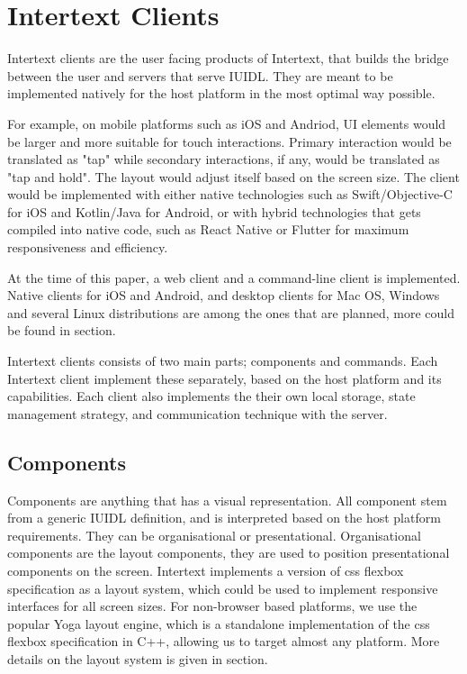 
\section{Intertext Clients} \label{intertextClients}

Intertext clients are the user facing products of Intertext, that builds the bridge between the user and servers that serve IUIDL. They are meant to be implemented natively for the host platform in the most optimal way possible. 

For example, on mobile platforms such as iOS and Andriod, UI elements would be larger and more suitable for touch interactions. Primary interaction would be translated as "tap" while secondary interactions, if any, would be translated as "tap and hold". The layout would adjust itself based on the screen size. The client would be implemented with either native technologies such as Swift/Objective-C for iOS and Kotlin/Java for Android, or with hybrid technologies that gets compiled into native code, such as React Native or Flutter for maximum responsiveness and efficiency. 

At the time of this paper, a web client and a command-line client is implemented. Native clients for iOS and Android, and desktop clients for Mac OS, Windows and several Linux distributions are among the ones that are planned, more could be found in  section.

Intertext clients consists of two main parts; components and commands. Each Intertext client implement these separately, based on the host platform and its capabilities. Each client also implements the  their own local storage, state management strategy, and communication technique with the server.

\subsection{Components}

Components are anything that has a visual representation. All component stem from a generic IUIDL definition, and is interpreted based on the host platform requirements. They can be organisational or presentational. Organisational components are the layout components, they are used to position presentational components on the screen. Intertext implements a version of css flexbox specification as a layout system, which could be used to implement responsive interfaces for all screen sizes. For non-browser based platforms, we use the popular Yoga layout engine, which is a standalone implementation of the css flexbox specification in C++, allowing us to target almost any platform. More details on the layout system is given in  section.

